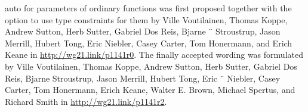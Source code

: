 auto for parameters of ordinary functions was first proposed together with the option to use type constraints for them by Ville Voutilainen, Thomas Koppe, Andrew Sutton, Herb Sutter, Gabriel Dos Reis, Bjarne ¨ Stroustrup, Jason Merrill, Hubert Tong, Eric Niebler, Casey Carter, Tom Honermann, and Erich Keane in \url{http://wg21.link/p1141r0}. The finally accepted wording was formulated by Ville Voutilainen, Thomas Koppe, Andrew Sutton, Herb Sutter, Gabriel Dos Reis, Bjarne Stroustrup, Jason Merrill, Hubert Tong, Eric ¨ Niebler, Casey Carter, Tom Honermann, Erich Keane, Walter E. Brown, Michael Spertus, and Richard Smith in \url{http://wg21.link/p1141r2}.